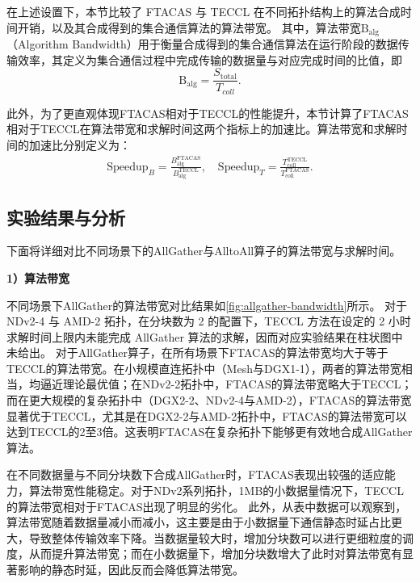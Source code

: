 在上述设置下，本节比较了 FTACAS 与 TECCL 在不同拓扑结构上的算法合成时间开销，以及其合成得到的集合通信算法的算法带宽。
其中，算法带宽$\mathrm{B_{alg}}$（Algorithm Bandwidth）用于衡量合成得到的集合通信算法在运行阶段的数据传输效率，其定义为集合通信过程中完成传输的数据量与对应完成时间的比值，即
\begin{equation}
\mathrm{B_{alg}}
=
\frac{S_{\mathrm{total}}}{T_{coll}}.
\end{equation}

此外，为了更直观体现FTACAS相对于TECCL的性能提升，本节计算了FTACAS相对于TECCL在算法带宽和求解时间这两个指标上的加速比。算法带宽和求解时间的加速比分别定义为：
\begin{equation}
\begin{aligned}
\mathrm{Speedup}_{B} = \frac{B_{\mathrm{alg}}^{\mathrm{FTACAS}}}{B_{\mathrm{alg}}^{\mathrm{TECCL}}}, \quad
\mathrm{Speedup}_{T} = \frac{T_{\mathrm{coll}}^{\mathrm{TECCL}}}{T_{\mathrm{coll}}^{\mathrm{FTACAS}}}.
\end{aligned}
\end{equation}

\subsection{实验结果与分析}

下面将详细对比不同场景下的AllGather与AlltoAll算子的算法带宽与求解时间。

\noindent\quad\textbf{1）算法带宽}

不同场景下AllGather的算法带宽对比结果如\autoref {fig:allgather-bandwidth}所示。
对于 NDv2-4 与 AMD-2 拓扑，在分块数为 2 的配置下，TECCL 方法在设定的 2 小时求解时间上限内未能完成 AllGather 算法的求解，因而对应实验结果在柱状图中未给出。
对于AllGather算子，在所有场景下FTACAS的算法带宽均大于等于TECCL的算法带宽。在小规模直连拓扑中（Mesh与DGX1-1），两者的算法带宽相当，均逼近理论最优值；在NDv2-2拓扑中，FTACAS的算法带宽略大于TECCL；而在更大规模的复杂拓扑中（DGX2-2、NDv2-4与AMD-2），FTACAS的算法带宽显著优于TECCL，尤其是在DGX2-2与AMD-2拓扑中，FTACAS的算法带宽可以达到TECCL的2至3倍。这表明FTACAS在复杂拓扑下能够更有效地合成AllGather算法。

在不同数据量与不同分块数下合成AllGather时，FTACAS表现出较强的适应能力，算法带宽性能稳定。对于NDv2系列拓扑，1MB的小数据量情况下，TECCL的算法带宽相对于FTACAS出现了明显的劣化。
此外，从表中数据可以观察到，算法带宽随着数据量减小而减小，这主要是由于小数据量下通信静态时延占比更大，导致整体传输效率下降。当数据量较大时，增加分块数可以进行更细粒度的调度，从而提升算法带宽；而在小数据量下，增加分块数增大了此时对算法带宽有显著影响的静态时延，因此反而会降低算法带宽。

